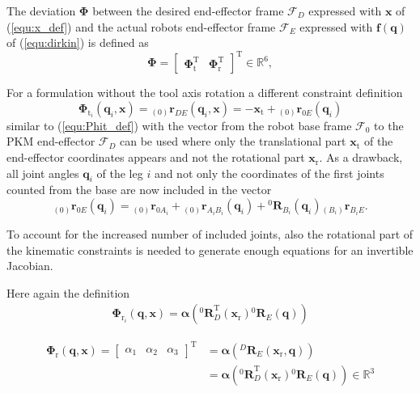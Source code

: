 \documentclass[robotics,article,submit,moreauthors,pdftex]{Definitions/mdpi}
\newcommand{\bm}[1]{\boldsymbol{#1}}
\newcommand{\ortvek}[4]{{ }_{(#1)}{\boldsymbol{#2}}^{#3}_{#4} }
\newcommand{\rotmat}[2]{{{ }^{#1}\boldsymbol{R}}_{#2}}
\newcommand{\transp}[0]{{\mathrm{T}}}
\newcommand{\ks}[1]{{\mathcal{F}}_{#1}}
\begin{document}
The deviation $\bm{\Phi}$ between the desired end-effector frame $\ks{D}$ expressed with $\bm{x}$ of (\ref{equ:x_def}) and the actual robots end-effector frame $\ks{E}$ expressed with $\bm{f}(\bm{q})$ of (\ref{equ:dirkin}) is defined as
%
\begin{equation}
\bm{\Phi}=\begin{bmatrix}
\bm{\Phi}_{\mathrm{t}}^\transp & \bm{\Phi}_{\mathrm{r}}^\transp
\end{bmatrix}^\transp \in {\mathbb{R}}^{6},
\label{equ:Phi_def}
\end{equation}


For a formulation without the tool axis rotation a different constraint definition
%
\begin{equation}
\bm{\Phi}_{\mathrm{t}_i}(\bm{q}_i,\bm{x}) = 
\ortvek{0}{r}{}{DE}(\bm{q}_i,\bm{x}) =
- \bm{x}_{\mathrm{t}} + \ortvek{0}{r}{}{0E}(\bm{q}_i) 
\end{equation}
%
similar to (\ref{equ:Phit_def}) with the vector from the robot base frame $\ks{0}$ to the PKM end-effector $\ks{D}$ can be used where 
only the translational part $\bm{x}_{\mathrm{t}}$ of the end-effector coordinates appears and not the rotational part $\bm{x}_{\mathrm{r}}$.
As a drawback, all joint angles $\bm{q}_i$ of the leg $i$ and not only the coordinates of the first joints counted from the base are now included
in the vector
%
\begin{equation}
\ortvek{0}{r}{}{0E}(\bm{q}_i) = 
\ortvek{0}{r}{}{0A_i}
+ \ortvek{0}{r}{}{A_iB_i}(\bm{q}_i) + \rotmat{0}{B_i}(\bm{q}_i) \ortvek{B_i}{r}{}{B_iE}.
\end{equation}
%



To account for the increased number of included joints, also the rotational part of the kinematic constraints is needed to generate enough equations for an invertible Jacobian.

Here again the definition 
%
\begin{align}
\bm{\Phi}_{\mathrm{r}_i}(\bm{q},\bm{x})
=\bm{\alpha}\left(\rotmat{0}{D}^\transp (\bm{x}_{\mathrm{r}})\rotmat{0}{E}(\bm{q})\right)
\end{align}

\begin{align}
\bm{\Phi}_{\mathrm{r}}(\bm{q},\bm{x}) 
= \begin{bmatrix}
\alpha_1  & \alpha_2 & \alpha_3
\end{bmatrix}^\transp
&=\bm{\alpha}\left(\rotmat{D}{E}(\bm{x}_{\mathrm{r}},\bm{q})\right)\nonumber \\
&=\bm{\alpha}\left(\rotmat{0}{D}^\transp (\bm{x}_{\mathrm{r}})\rotmat{0}{E}(\bm{q})\right) \in {\mathbb{R}}^{3}
\label{equ:Phir_def}
\end{align}
\end{document}
